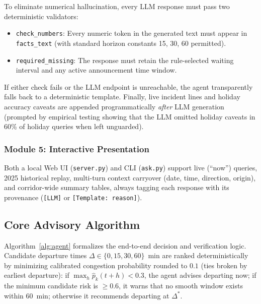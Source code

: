 To eliminate numerical hallucination, every LLM response must pass two deterministic validators:
\begin{itemize}
    \item \texttt{check\_numbers}: Every numeric token in the generated text must appear in \texttt{facts\_text} (with standard horizon constants 15, 30, 60 permitted).
    \item \texttt{required\_missing}: The response must retain the rule-selected waiting interval and any active announcement time window.
\end{itemize}
If either check fails or the LLM endpoint is unreachable, the agent transparently falls back to a deterministic template. Finally, live incident lines and holiday accuracy caveats are appended programmatically \textit{after} LLM generation (prompted by empirical testing showing that the LLM omitted holiday caveats in 60\% of holiday queries when left unguarded).

\subsubsection{Module 5: Interactive Presentation}
Both a local Web UI (\texttt{server.py}) and CLI (\texttt{ask.py}) support live (``now'') queries, 2025 historical replay, multi-turn context carryover (date, time, direction, origin), and corridor-wide summary tables, always tagging each response with its provenance (\texttt{[LLM]} or \texttt{[Template: reason]}).

\subsection{Core Advisory Algorithm}
Algorithm~\ref{alg:agent} formalizes the end-to-end decision and verification logic. Candidate departure times $\Delta \in \{0, 15, 30, 60\}$~min are ranked deterministically by minimizing calibrated congestion probability rounded to $0.1$ (ties broken by earliest departure): if $\max_h \hat{p}_k(t+h) < 0.3$, the agent advises departing now; if the minimum candidate risk is $\ge 0.6$, it warns that no smooth window exists within 60~min; otherwise it recommends departing at $\Delta^*$.

